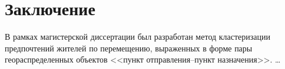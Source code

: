 \part{Заключение}
В рамках магистерской диссертации был разработан метод кластеризации предпочтений жителей по перемещению, выраженных в форме пары геораспределенных объектов <<пункт отправления--пункт назначения>>. \ldots
